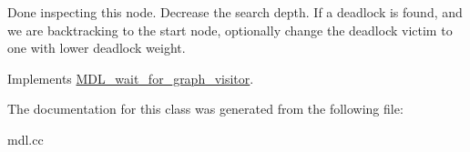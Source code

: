 Done inspecting this node. Decrease the search depth. If a deadlock is found, and we are backtracking to the start node, optionally change the deadlock victim to one with lower deadlock weight. 

Implements \mbox{\hyperlink{classMDL__wait__for__graph__visitor}{M\+D\+L\+\_\+wait\+\_\+for\+\_\+graph\+\_\+visitor}}.



The documentation for this class was generated from the following file\+:\begin{DoxyCompactItemize}
\item 
mdl.\+cc\end{DoxyCompactItemize}
